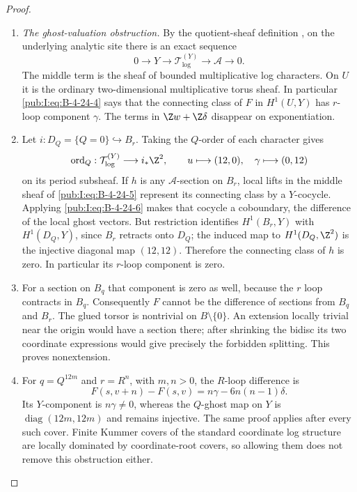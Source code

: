 \begin{proof}
\begin{enumerate}[label=\arabic*.,leftmargin=*]
\item \emph{The ghost-valuation obstruction.}
By the quotient-sheaf definition
\citep[Sections 1.3.1--1.3.4, pp.~81--82]{KKN2008Root},
on the underlying analytic site there is an exact sequence
\begin{equation}
 0\longrightarrow Y\longrightarrow
 \mathcal T_{\log}^{(Y)}\longrightarrow
 \mathcal A\longrightarrow0.
\label{pub:I:eq:B-4-24-5}
\end{equation}
The middle term is the sheaf of bounded multiplicative
log characters. On $U$ it is the ordinary
two-dimensional multiplicative torus sheaf.
In particular \eqref{pub:I:eq:B-4-24-4} says that the connecting
class of $F$ in $H^1(U,Y)$ has $r$-loop component
$\gamma$. The terms in $\Z w+\Z\delta$ disappear
on exponentiation.

\item Let $i:D_Q=\{Q=0\}\hookrightarrow B_r$.
Taking the $Q$-order of each character gives
\begin{equation}
 \operatorname{ord}_Q:
 \mathcal T_{\log}^{(Y)}\longrightarrow i_*\Z^2,
 \qquad
 u\longmapsto(12,0),\quad
 \gamma\longmapsto(0,12)
\label{pub:I:eq:B-4-24-6}
\end{equation}
on its period subsheaf. If $h$ is any
$\mathcal A$-section on $B_r$, local lifts in
the middle sheaf of \eqref{pub:I:eq:B-4-24-5} represent its
connecting class by a $Y$-cocycle. Applying
\eqref{pub:I:eq:B-4-24-6} makes that cocycle a coboundary,
the difference of the local ghost vectors.
But restriction identifies $H^1(B_r,Y)$ with
$H^1(D_Q,Y)$, since $B_r$ retracts onto $D_Q$;
the induced map to $H^1(D_Q,\Z^2)$ is the
injective diagonal map $(12,12)$. Therefore
the connecting class of $h$ is zero. In
particular its $r$-loop component is zero.

\item For a section on $B_q$ that component is zero
as well, because the $r$ loop contracts in $B_q$.
Consequently $F$ cannot be the difference of
sections from $B_q$ and $B_r$. The glued torsor
is nontrivial on $B\setminus\{0\}$. An extension
locally trivial near the origin would have a
section there; after shrinking the bidisc its
two coordinate expressions would give precisely
the forbidden splitting. This proves nonextension.

\item For $q=Q^{12m}$ and $r=R^n$, with $m,n>0$,
the $R$-loop difference is
\[
 F(s,v+n)-F(s,v)
    =n\gamma-6n(n-1)\delta.
\]
Its $Y$-component is $n\gamma\ne0$,
whereas the $Q$-ghost map on $Y$ is
$\operatorname{diag}(12m,12m)$ and remains
injective. The same proof applies after every
such cover. Finite Kummer covers of the standard
coordinate log structure are locally dominated
by coordinate-root covers, so allowing them
does not remove this obstruction either.


\end{enumerate}
\end{proof}

